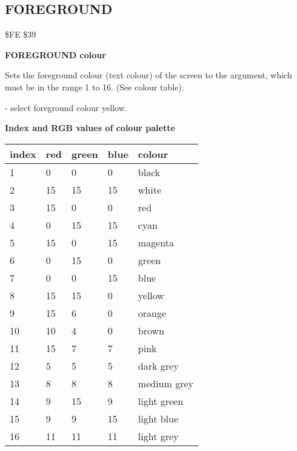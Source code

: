 
\newpage
\subsection{FOREGROUND}
\begin{description}[leftmargin=3cm,style=nextline]
\item [Token:] \$FE \$39
\item [Format:] {\bf FOREGROUND colour}
\item [Usage:] Sets the foreground colour
               (text colour) of the screen to the argument,
               which must be in the
               range 1 to 16. (See colour table).
\item [Example:]  - select foreground colour yellow.
\item [Colours:] {\bf Index and RGB values of colour palette}

\ttfamily
{\setlength{\tabcolsep}{1mm}
\begin{tabular}{*{4}{|R{1.2cm}}|l|}
\hline
 index  &   red & green & blue & colour \\
 &    0  &   0   &  0   & black \\
  2 &   15  &  15   & 15   & white \\
  3 &   15  &   0   &  0   & red   \\
  4 &    0  &  15   & 15   & cyan  \\
  5 &   15  &   0   & 15   & magenta\\
  6 &    0  &  15   &  0   & green \\
  7 &    0  &   0   & 15   & blue  \\
  8 &   15  &  15   &  0   & yellow\\
  9 &   15  &   6   &  0   & orange\\
 10 &   10  &   4   &  0   & brown \\
 11 &   15  &   7   &  7   & pink  \\
 12 &    5  &   5   &  5   & dark grey\\
 13 &    8  &   8   &  8   & medium grey\\
 14 &    9  &  15   &  9   & light green \\
 15 &    9  &   9   & 15   & light blue\\
 16 &   11  &  11   & 11   & light grey\\
\hline
\end{tabular}
}
\end{description}

